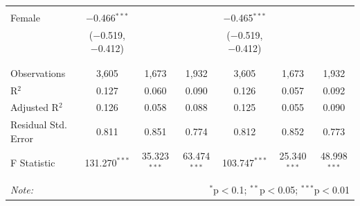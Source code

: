 \documentclass[12pt,a4paper]{article}
\numberwithin{equation}{section}
\begin{document}
\begin{landscape}
\begin{table}[!htbp]
\begin{tabular}{@{\extracolsep{5pt}}lcccccc}
			& & & & & & \\ 
			Female & $-$0.466$^{***}$ &  &  & $-$0.465$^{***}$ &  &  \\ 
			& ($-$0.519, $-$0.412) &  &  & ($-$0.519, $-$0.412) &  &  \\ 
			& & & & & & \\ 
			\hline \\[-1.8ex] 
			Observations & 3,605 & 1,673 & 1,932 & 3,605 & 1,673 & 1,932 \\ 
			R$^{2}$ & 0.127 & 0.060 & 0.090 & 0.126 & 0.057 & 0.092 \\ 
			Adjusted R$^{2}$ & 0.126 & 0.058 & 0.088 & 0.125 & 0.055 & 0.090 \\ 
			Residual Std. Error & 0.811 & 0.851 & 0.774 & 0.812 & 0.852 & 0.773 \\ 
			F Statistic & 131.270$^{***}$ & 35.323$^{***}$ & 63.474$^{***}$ & 103.747$^{***}$ & 25.340$^{***}$ & 48.998$^{***}$ \\ 
			\hline 
			\hline \\[-1.8ex] 
			\textit{Note:}  & \multicolumn{6}{r}{$^{*}$p$<$0.1; $^{**}$p$<$0.05; $^{***}$p$<$0.01} \\ 
		\end{tabular} 
	\end{table} 
	
\end{landscape}

\newpage
\end{document}
